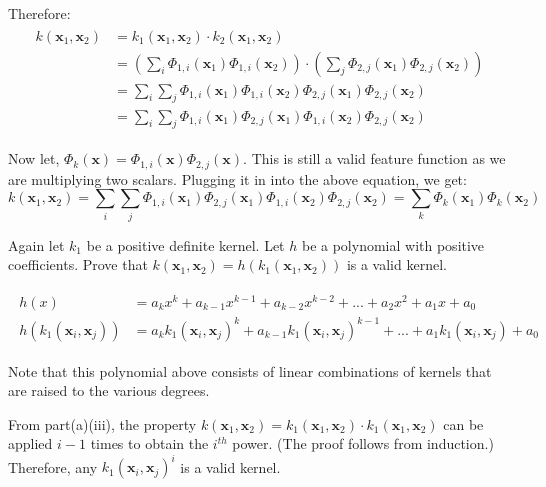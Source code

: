 \begin{Parts}
\begin{solution}
\begin{enumerate}[i.]
Therefore:
\begin{align*}\begin{split}
k(\textbf{x}_1, \textbf{x}_2) & = k_1(\textbf{x}_1, \textbf{x}_2)\cdot k_2(\textbf{x}_1, \textbf{x}_2) \\
& = (\sum_{i} \Phi_{1,i}(\textbf{x}_1)\Phi_{1,i}(\textbf{x}_2))\cdot(\sum_{j} \Phi_{2,j}(\textbf{x}_1)\Phi_{2,j}(\textbf{x}_2)) \\
& = \sum_i \sum_j \Phi_{1,i}(\textbf{x}_1)\Phi_{1,i}(\textbf{x}_2) \Phi_{2,j}(\textbf{x}_1)\Phi_{2,j}(\textbf{x}_2)\\
& = \sum_i \sum_j \Phi_{1,i}(\textbf{x}_1)\Phi_{2,j}(\textbf{x}_1)\Phi_{1,i}(\textbf{x}_2) \Phi_{2,j}(\textbf{x}_2)
\end{split}\end{align*}

Now let, $ \Phi_k(\textbf{x}) =\Phi_{1,i}(\textbf{x}) \Phi_{2,j}(\textbf{x})$. This is still a valid feature function as we are multiplying two scalars. Plugging it in into the above equation, we get: 
$$ k(\textbf{x}_1, \textbf{x}_2) = \sum_{i} \sum_j \Phi_{1,i}(\textbf{x}_1)\Phi_{2,j}(\textbf{x}_1)\Phi_{1,i}(\textbf{x}_2) \Phi_{2,j}(\textbf{x}_2) = \sum_{k} \Phi_{k}(\textbf{x}_1)\Phi_{k}(\textbf{x}_2)$$

\end{enumerate}

\end{solution}

\Part Again let $ k_1 $ be a positive definite kernel. Let $ h $ be a polynomial with positive coefficients. Prove that $ k(\textbf{x}_1, \textbf{x}_2) = h(k_1(\textbf{x}_1, \textbf{x}_2)) $ is a valid kernel.

\begin{solution}
\begin{align*}\begin{split}
 h(x) & = a_k x^{k} + a_{k-1}x^{k-1} + a_{k-2}x^{k-2} + ... + a_2 x^{2} + a_1 x + a_0 \\
h(k_1(\textbf{x}_i, \textbf{x}_j)) & = a_k k_1(\textbf{x}_i, \textbf{x}_j)^{k} + a_{k-1}k_1(\textbf{x}_i, \textbf{x}_j)^{k-1} + ... +  a_1 k_1(\textbf{x}_i, \textbf{x}_j) + a_0 
\end{split}\end{align*}

Note that this polynomial above consists of linear combinations of kernels that are raised to the various degrees.

From part(a)(iii), the property $ k(\textbf{x}_1, \textbf{x}_2) = k_1(\textbf{x}_1, \textbf{x}_2)\cdot k_1(\textbf{x}_1, \textbf{x}_2)$ can be applied $ i-1 $ times to obtain the $i^{th}$ power. (The proof follows from induction.) Therefore, any $ k_1(\textbf{x}_i, \textbf{x}_j)^i $ is a valid kernel.


\end{solution}
\end{Parts}
